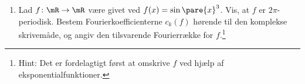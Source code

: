 \begin{opg}[Fourierrækker I]
\begin{enumerate}
	\item Lad $f\colon \mR \to \mR$ være givet ved $f(x)=\sin\pare{x}^3$. Vis, at $f$ er $2\pi$-periodisk. Bestem Fourierkoefficienterne $c_k(f)$ hørende til den komplekse skrivemåde, og angiv den tilsvarende Fourierrække for $f$.\footnote{Hint: Det er fordelagtigt først at omskrive $f$ ved hjælp af eksponentialfunktioner.}
	
	\iffalse\begin{proof}[Løsning]
	Bemærk først at $\sin$ er $2\pi$-periodisk, hvorfor $f$ ligeledes er $2\pi$-periodisk. Før vi beregner Fourierkoefficienterne omskrives $x$ ved hjælp af eksponentialfunktioner, nemlig
	$$ f\pare{x} = \sin\pare{x}^3 = \pare{\frac{e^{ix} - e^{-ix}}{2i}}^3
        = \frac{1}{i8}\pare{e^{-i3x} - 3e^{-ix} + 3e^{ix} - e^{i3x}} $$
    Vi får således af MC 5.21, at dette er netop Fourierrækken for $f$ med koefficenter
    $$ c_{-3} = \frac{1}{i8}, \Quad c_{-1} = -\frac{3}{i8}
     \Quad c_1 = \frac{3}{i8}, \Quad c_3 = -\frac{1}{i8}. $$
	
	\end{proof}\fi
\end{enumerate}
\end{opg}

